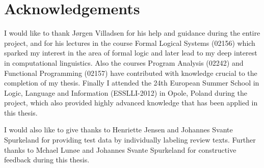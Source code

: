 
\chapter{Acknowledgements}

I would like to thank Jørgen Villadsen for his help and guidance during the entire project, and for his lectures in the course Formal Logical Systems (02156) which sparked my interest in the area of formal logic and later lead to my deep interest in computational linguistics. Also the courses Program Analysis (02242) and Functional Programming (02157) have contributed with knowledge crucial to the completion of my thesis. Finally I attended the 24th European Summer School in Logic, Language and Information (ESSLLI-2012) in Opole, Poland during the project, which also provided highly advanced knowledge that has been applied in this thesis.

I would also like to give thanks to Henriette Jensen and Johannes Svante Spurkeland for providing test data by individually labeling review texts. Further thanks to Mchael Lunøe and Johannes Svante Spurkeland for constructive feedback during this thesis.
